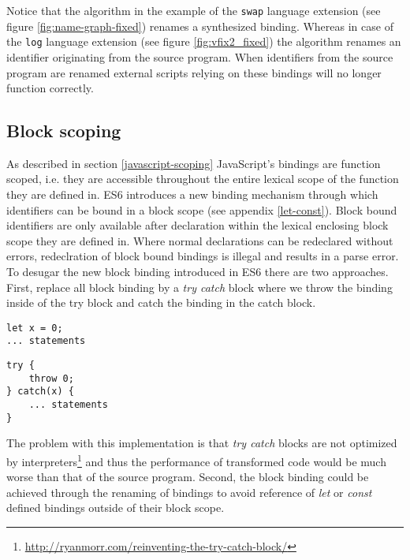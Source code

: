 Notice that the \textit{\vfix} algorithm in the example of the \lstinline$swap$ language extension (see figure \ref{fig:name-graph-fixed}) renames a synthesized binding. Whereas in case of the \lstinline$log$ language extension (see figure \ref{fig:vfix2_fixed}) the \textit{\vfix} algorithm renames an identifier originating from the source program. When identifiers from the source program are renamed external scripts relying on these bindings will no longer function correctly.

\subsection{Block scoping}

As described in section \ref{javascript-scoping} JavaScript's bindings are function scoped, i.e. they are accessible throughout the entire lexical scope of the function they are defined in. ES6 introduces a new binding mechanism through which identifiers can be bound in a block scope (see appendix \ref{let-const}). Block bound identifiers are only available after declaration within the lexical enclosing block scope they are defined in. Where normal declarations can be redeclared without errors, redeclration of block bound bindings is illegal and results in a parse error. To desugar the new block binding introduced in ES6  there are two approaches. First, replace all block binding by a \textit{try catch} block where we throw the binding inside of the try block and catch the binding in the catch block.

\begin{minipage}{0.45\linewidth}
\begin{lstlisting}
let x = 0;
... statements
\end{lstlisting}
\end{minipage}
\hfill
\begin{minipage}{0.45\linewidth}
\begin{lstlisting}
try {
	throw 0;
} catch(x) {
	... statements
}
\end{lstlisting}
\end{minipage}

The problem with this implementation is that \textit{try catch} blocks are not optimized by interpreters\footnote{\url{http://ryanmorr.com/reinventing-the-try-catch-block/}} and thus the performance of transformed code would be much worse than that of the source program. Second, the block binding could be achieved through the renaming of bindings to avoid reference of \textit{let} or \textit{const} defined bindings outside of their block scope.


